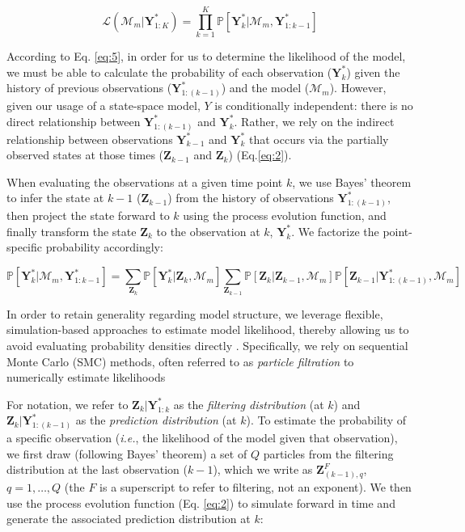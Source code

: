 \documentclass{article}
\begin{document}
\begin{equation}
\label{eq:5}
\mathcal{L}(\mathcal{M}_m|\textbf{Y}^{*}_{1:K}) = \prod_{k = 1}^{K}{\mathbb{P}[\textbf{Y}^{*}_{k}|\mathcal{M}_m, \textbf{Y}^{*}_{1:k-1}]}
\end{equation}

According to Eq. \ref{eq:5}, in order for us to determine the likelihood of the model, we must be able to calculate the probability of each observation ($\textbf{Y}^{*}_{k}$) given the history of previous observations ($\textbf{Y}^{*}_{1:(k-1)}$) and the model ($\mathcal{M}_m$). However, given our usage of a state-space model, $Y$ is conditionally independent: there is no direct relationship between $\textbf{Y}^{*}_{1:(k-1)}$ and $\textbf{Y}^{*}_{k}$. Rather, we rely on the indirect relationship between  observations $\textbf{Y}^{*}_{k-1}$ and $\textbf{Y}^{*}_{k}$ that occurs via the partially observed states at those times ($\textbf{Z}_{k-1}$ and $\textbf{Z}_{k}$) (Eq.\ref{eq:2}). 

When evaluating the observations at a given time point $k$, we use Bayes' theorem  to infer the state at $k-1$ ($\textbf{Z}_{k-1}$) from the history of observations $\textbf{Y}^{*}_{1:(k-1)}$, then project the state forward to $k$ using the process evolution function, and finally transform the state $\textbf{Z}_{k}$ to the observation at $k$, $\textbf{Y}^{*}_{k}$. We factorize the point-specific probability accordingly:

\begin{equation}
\label{eq:6}
\mathbb{P}[\textbf{Y}^{*}_{k}|\mathcal{M}_m, \textbf{Y}^{*}_{1:k-1}] = \sum_{\textbf{Z}_k}{\mathbb{P}[\textbf{Y}^*_k|\textbf{Z}_k, \mathcal{M}_m]}\sum_{\textbf{Z}_{k-1}}{\mathbb{P}[\textbf{Z}_k|\textbf{Z}_{k-1}, \mathcal{M}_m]\mathbb{P}[\textbf{Z}_{k-1}|\textbf{Y}^*_{1:(k-1)}, \mathcal{M}_m]}
\end{equation}

In order to retain generality regarding model structure, we leverage flexible, simulation-based approaches to estimate model likelihood, thereby allowing us to avoid evaluating probability densities directly \citep{Breto2009, He2010, Ionides2015}. Specifically, we rely on sequential Monte Carlo (SMC) methods, often referred to as \emph{particle filtration} to numerically estimate likelihoods \citep{Kitagawa1987, Doucet2001, Ionides2006}

For notation, we refer to $\textbf{Z}_{k}|\textbf{Y}^*_{1:k}$ as the \emph{filtering distribution} (at $k$) and $\textbf{Z}_{k}|\textbf{Y}^*_{1:(k-1)}$ as the \emph{prediction distribution} (at $k$). To estimate the probability of a specific observation (\emph{i.e.}, the likelihood of the model given that observation), we first draw (following Bayes' theorem) a set of $Q$ particles from the filtering distribution at the last observation ($k-1$), which we write as $\textbf{Z}^{F}_{(k-1),q}$, $q = 1, \ldots, Q$ (the $F$ is a superscript to refer to filtering, not an exponent). We then use the process evolution function (Eq. \ref{eq:2}) to simulate forward in time and generate the associated prediction distribution at $k$:
\end{document}
